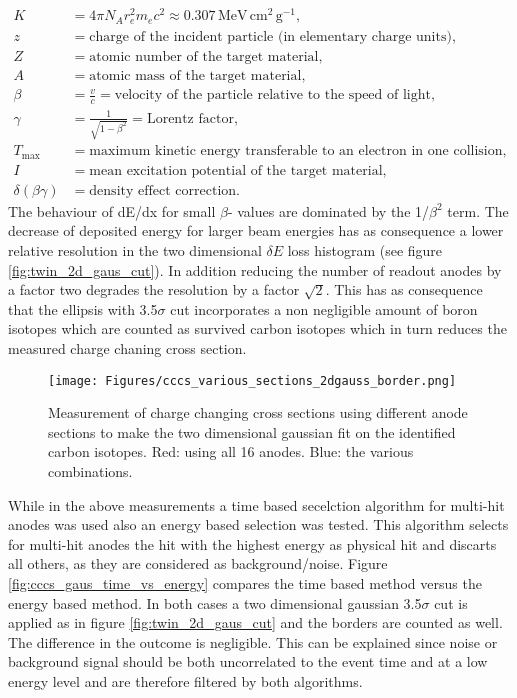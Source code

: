 \begin{align*}
K &= 4 \pi N_A r_e^2 m_e c^2 \approx 0.307 \, \text{MeV} \, \text{cm}^2 \, \text{g}^{-1}, \\
z &= \text{charge of the incident particle (in elementary charge units)}, \\
Z &= \text{atomic number of the target material}, \\
A &= \text{atomic mass of the target material}, \\
\beta &= \frac{v}{c} = \text{velocity of the particle relative to the speed of light}, \\
\gamma &= \frac{1}{\sqrt{1 - \beta^2}} = \text{Lorentz factor}, \\
T_{\text{max}} &= \text{maximum kinetic energy transferable to an electron in one collision}, \\
I &= \text{mean excitation potential of the target material}, \\
\delta(\beta \gamma) &= \text{density effect correction}.
\end{align*}
The behaviour of dE/dx for small $\beta$- values are dominated by the 1/$\beta^2$ term. The decrease of deposited energy for larger beam energies has as consequence a lower relative resolution in the two dimensional $\delta E$ loss histogram (see figure \ref{fig:twin_2d_gaus_cut}). In addition reducing the number of readout anodes by a factor two degrades the resolution by a factor $\sqrt{2}$. This has as consequence that the ellipsis with 3.5$\sigma$ cut incorporates a non negligible amount of boron isotopes which are counted as survived carbon isotopes which in turn reduces the measured charge chaning cross section.
\begin{figure}[htpb]
    \centering
    \texttt{[image: Figures/cccs\_various\_sections\_2dgauss\_border.png]}
    \caption{
   	Measurement of charge changing cross sections using different anode sections to make the two dimensional gaussian fit on the identified carbon isotopes. Red: using all 16 anodes. Blue: the various combinations. 
     }
    \label{fig:cccs_gaus_diff_sections}
\end{figure}
While in the above measurements a time based secelction algorithm for multi-hit anodes was used also an energy based selection was tested. This algorithm selects for multi-hit anodes the hit with the highest energy as physical hit and discarts all others, as they are considered as background/noise. Figure \ref{fig:cccs_gaus_time_vs_energy} compares the time based method versus the energy based method. In both cases a two dimensional gaussian 3.5$\sigma$ cut is applied as in figure \ref{fig:twin_2d_gaus_cut} and the borders are counted as well. The difference in the outcome is negligible. This can be explained since noise or background signal should be both uncorrelated to the event time and at a low energy level and are therefore filtered by both algorithms.
